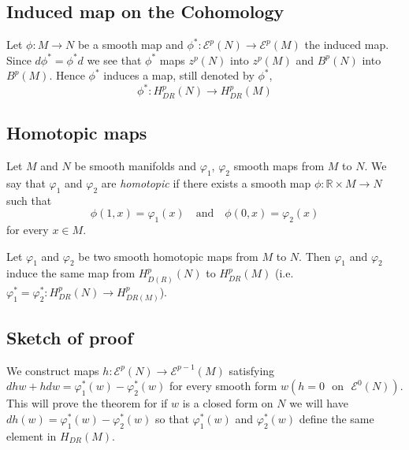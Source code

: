 \subsection*{Induced map on the Cohomology}

Let $\phi:M\to N$ be a smooth map and $\phi^{*}:\mathscr{E}^{p}(N)\to \mathscr{E}^{p}(M)$ the induced map. Since $d\phi^{*}=\phi^{*}d$ we see that $\phi^{*}$ maps $z^{p}(N)$ into $z^{p}(M)$ and $B^{p}(N)$ into $B^{p}(M)$. Hence $\phi^{*}$ induces a map, still denoted by $\phi^{*}$,
$$
\phi^{*}:H^{p}_{DR}(N)\to H^{p}_{DR}(M)
$$

\subsection*{Homotopic maps}

\begin{defi*}
Let $M$ and $N$ be smooth manifolds and $\varphi_{1}$, $\varphi_{2}$ smooth maps from $M$ to $N$. We say that $\varphi_{1}$ and $\varphi_{2}$ are {\em homotopic} if there exists a smooth map $\phi:\mathbb{R}\times M\to N$ such that
$$
\phi(1,x)=\varphi_{1}(x)\quad\text{and}\quad \phi(0,x)=\varphi_{2}(x)
$$
for every $x\in M$.
\end{defi*}

\begin{theorem}\label{sec4-thm4.2}
Let $\varphi_{1}$ and $\varphi_{2}$ be two smooth homotopic maps from $M$ to $N$. Then $\varphi_{1}$ and $\varphi_{2}$ induce the same map from $H^{p}_{D(R)}(N)$ to $H^{p}_{DR}(M)$ (i.e. $\varphi^{*}_{1}=\varphi^{*}_{2}:H^{p}_{DR}(N)\to H^{p}_{DR(M)}$).
\end{theorem}

\subsection*{Sketch of proof}

We construct maps $h:\mathscr{E}^{p}(N)\to \mathscr{E}^{p-1}(M)$ satisfying $dhw+hdw=\varphi^{*}_{1}(w)-\varphi^{*}_{2}(w)$ for every smooth form $w(h=0\text{~ on~ } \mathscr{E}^{0}(N))$. This will prove the theorem for if $w$ is a closed form on $N$ we will have\pageoriginale $dh(w)=\varphi^{*}_{1}(w)-\varphi^{*}_{2}(w)$ so that $\varphi^{*}_{1}(w)$ and $\varphi^{*}_{2}(w)$ define the same element in $H_{DR}(M)$.


